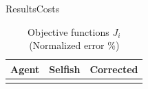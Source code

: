 \documentclass[aspectratio=169]{beamer}
\begin{document}


\begin{frame}{Results}{Costs}
  \begin{table}[h]
    \centering
    \caption*{Objective functions $J_{i}$ (Normalized error \%)}\label{tab:eq_costsGlobalLocal}
    \begin{tabular}[t]{crr}
      \toprule
      Agent  & Selfish & Corrected\\
      \midrule
      \\
      \bottomrule
    \end{tabular}
  \end{table}
\end{frame}
\end{document}
